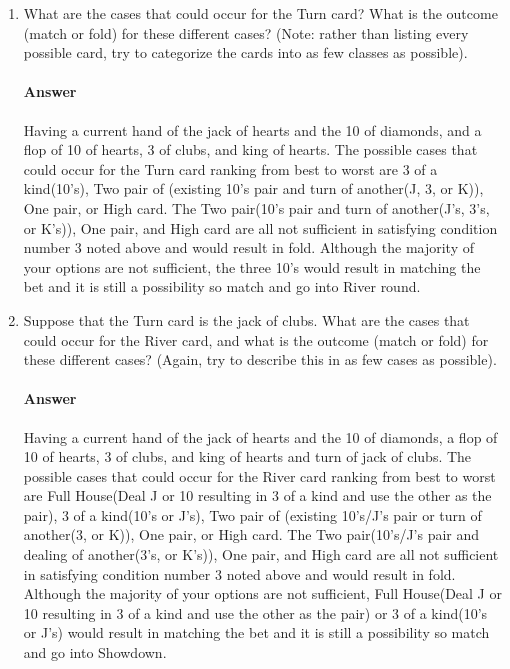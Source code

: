 \documentclass{article}
\begin{document}
\begin{enumerate}

    \item What are the cases that could occur for the Turn card?  What is the
        outcome (match or fold) for these different cases? (Note: rather than
        listing every possible card, try to categorize the cards into as few
        classes as possible).

    \paragraph{Answer}
    Having a current hand of the jack of hearts and the 10 of diamonds, and a flop of 10
    of hearts, 3 of clubs, and king of hearts. The possible cases that could occur for the Turn card
    ranking from best to worst are 3 of a kind(10's), Two pair of (existing 10's pair and turn of another(J, 3, or K)), One pair, or High card.
    The Two pair(10's pair and turn of another(J's, 3's, or K's)), One pair, and High card are all not
    sufficient in satisfying condition number 3 noted above and would result in fold. Although the majority of your options are not sufficient,
     the three 10's would result in matching the bet and it is still a possibility so match and go into River round.

    \item Suppose that the Turn card is the jack of clubs.
        What are the cases that could occur for the River card, and what is the
        outcome (match or fold) for these different cases?  (Again, try to
        describe this in as few cases as possible).

    \paragraph{Answer}
    Having a current hand of the jack of hearts and the 10 of diamonds, a flop of 10
    of hearts, 3 of clubs, and king of hearts and turn of jack of clubs. The possible cases that could occur for the River card
    ranking from best to worst are Full House(Deal J or 10 resulting in 3 of a kind and use the other as the pair), 3 of a kind(10's or J's),
    Two pair of (existing 10's/J's pair or turn of another(3, or K)), One pair, or High card.
    The Two pair(10's/J's pair and dealing of another(3's, or K's)), One pair, and High card are all not
    sufficient in satisfying condition number 3 noted above and would result in fold. Although the majority of your options are not sufficient,
    Full House(Deal J or 10 resulting in 3 of a kind and use the other as the pair) or 3 of a kind(10's or J's) would result in matching the bet and it
    is still a possibility so match and go into Showdown.

\end{enumerate}
\end{document}

